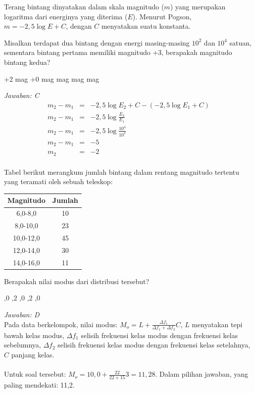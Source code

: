 \documentclass[11pt,fleqn]{exam}
\begin{document}
\begin{questions}
\question Terang bintang dinyatakan dalam skala magnitudo ($m$) yang merupakan logaritma dari energinya yang diterima ($E$). Menurut Pogson, $m=-2,5\log E+C$, dengan $C$ menyatakan suatu konstanta.

\noindent Misalkan terdapat dua bintang dengan energi masing-masing $10^2$ dan $10^4$ satuan, sementara bintang pertama memiliki magnitudo +3, berapakah magnitudo bintang kedua?
\begin{choices}
\choice +2 mag
\choice +0 mag
 mag
 mag
 mag
\end{choices}

\textit{Jawaban: C}
\begin{eqnarray*}
m_2-m_1&=&-2,5\log E_2+C - (-2,5\log E_1+C)\\
m_2-m_1&=&-2,5\log \frac{E_2}{E_1} \\
m_2-m_1&=&-2,5\log \frac{10^4}{10^2} \\
m_2-m_1&=&-5\\
m_2&=&-2\\
\end{eqnarray*}


\question Tabel berikut merangkum jumlah bintang dalam rentang magnitudo tertentu yang teramati oleh sebuah teleskop:
\begin{table}[H]
\centering
\begin{tabular}{|c|c|}
\hline
\textbf{Magnitudo} & \textbf{Jumlah} \\
\hline
6,0-8,0 & 10 \\
8,0-10,0 & 23 \\
10,0-12,0 & 45 \\
12,0-14,0 & 30 \\
14,0-16,0 & 11 \\
\hline
\end{tabular}
\end{table}

\noindent Berapakah nilai modus dari distribusi tersebut?
\begin{choices}
,0
,2
,0
,2
,0
\end{choices}

\textit{Jawaban: D} \\
Pada data berkelompok, nilai modus: $M_o=L+\frac{\Delta f_1}{\Delta f_1+\Delta f_2}C$, $L$ menyatakan tepi bawah kelas modus, $\Delta f_1$ selisih frekuensi kelas modus dengan frekuensi kelas sebelumnya, $\Delta f_2$ selisih frekuensi kelas modus dengan frekuensi kelas setelahnya, $C$ panjang kelas.\\ \\
Untuk soal tersebut: $M_o=10,0+\frac{22}{22+15}3=11,28$. Dalam pilihan jawaban, yang paling mendekati: 11,2.\\



\end{questions}
\end{document}
